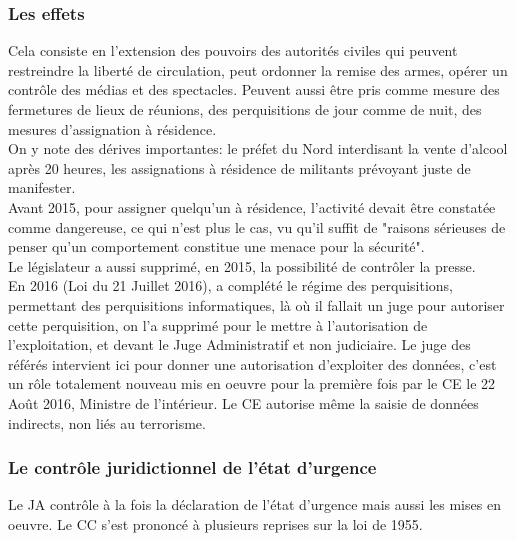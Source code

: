 \documentclass[10pt, a4paper, openany]{book}
\begin{document}
\subsubsection{Les effets}

Cela consiste en l'extension des pouvoirs des autorités civiles qui peuvent restreindre la liberté de circulation, peut ordonner la remise des armes, opérer un contrôle des médias et des spectacles. Peuvent aussi être pris comme mesure des fermetures de lieux de réunions, des perquisitions de jour comme de nuit, des mesures d'assignation à résidence. \\
On y note des dérives importantes: le préfet du Nord interdisant la vente d'alcool après 20 heures, les assignations à résidence de militants prévoyant juste de manifester. \\
Avant 2015, pour assigner quelqu'un à résidence, l'activité devait être constatée comme dangereuse, ce qui n'est plus le cas, vu qu'il suffit de "raisons sérieuses de penser qu'un comportement constitue une menace pour la sécurité". \\
Le législateur a aussi supprimé, en 2015, la possibilité de contrôler la presse. \\
En 2016 (Loi du 21 Juillet 2016), a complété le régime des perquisitions, permettant des perquisitions informatiques, là où il fallait un juge pour autoriser cette perquisition, on l'a supprimé pour le mettre à l'autorisation de l'exploitation, et devant le Juge Administratif et non judiciaire. Le juge des référés intervient ici pour donner une autorisation d'exploiter des données, c'est un rôle totalement nouveau mis en oeuvre pour la première fois par le CE le 22 Août 2016, Ministre de l'intérieur. Le CE autorise même la saisie de données indirects, non liés au terrorisme. 

\subsubsection{Le contrôle juridictionnel de l'état d'urgence}

Le JA contrôle à la fois la déclaration de l'état d'urgence mais aussi les mises en oeuvre. Le CC s'est prononcé à plusieurs reprises sur la loi de 1955.
\end{document}
